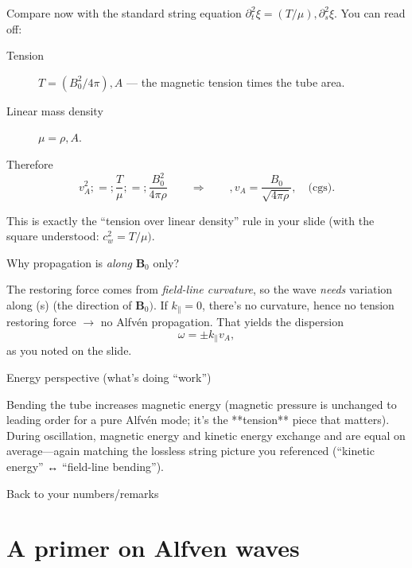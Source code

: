 
Compare now with the standard string equation 
\( \partial_t^2 \xi = (T/\mu),\partial_s^2\xi \).
You can read off:
%
\begin{description}
\item[Tension] \(T = (B_0^2/4\pi),A \) — the magnetic tension times the tube area.
\item[Linear mass density] \(\mu = \rho,A\).
\end{description}

Therefore
\[
v_A^2 ;=; \frac{T}{\mu} ;=; \frac{B_0^2}{4\pi\rho}
\qquad\Rightarrow\qquad
\boxed{,v_A=\frac{B_0}{\sqrt{4\pi\rho}},}\quad\text{(cgs)}.
\]

This is exactly the “tension over linear density” rule in your slide (with the square understood: \(c_w^2=T/\mu)\). 

Why propagation is \emph{along} \(\mathbf B_0\) only?

The restoring force comes from \emph{field-line curvature}, so the wave \emph{needs} variation along (s) (the direction of \(\mathbf B_0)\). 
%
If \(k_\parallel=0 \), there’s no curvature, hence no tension restoring force $\rightarrow$ no Alfvén propagation. That yields the dispersion
\[
\omega = \pm k_\parallel v_A,
\]
as you noted on the slide. 

Energy perspective (what’s doing “work”)

Bending the tube increases magnetic energy (magnetic pressure is unchanged to leading order for a pure Alfvén mode; it’s the **tension** piece that matters). During oscillation, magnetic energy and kinetic energy exchange and are equal on average—again matching the lossless string picture you referenced (“kinetic energy” ↔ “field-line bending”). 

Back to your numbers/remarks


\section{A primer on Alfven waves}

